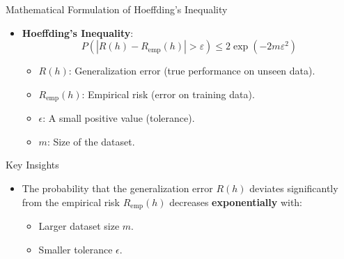 \documentclass[
  ignorenonframetext,
]{beamer}
\providecommand{\tightlist}{%
  \setlength{\itemsep}{0pt}\setlength{\parskip}{0pt}}\usepackage{longtable,booktabs,array}
\begin{document}
\begin{frame}{Mathematical Formulation of Hoeffding's Inequality}
\label{mathematical-formulation-of-hoeffdings-inequality}
\begin{itemize}
\tightlist
\item
  \textbf{Hoeffding's Inequality}: \[
  P(|R(h) - R_{\text{emp}}(h)| > \varepsilon) \leq 2 \exp(-2m\varepsilon^2)
  \]

  \begin{itemize}
  \tightlist
  \item
    \(R(h)\): Generalization error (true performance on unseen data).
  \item
    \(R_{\text{emp}}(h)\): Empirical risk (error on training data).
  \item
    \(\epsilon\): A small positive value (tolerance).
  \item
    \(m\): Size of the dataset.
  \end{itemize}
\end{itemize}
\end{frame}

\begin{frame}
\begin{block}{Key Insights}
\label{key-insights}
\begin{itemize}
\tightlist
\item
  The probability that the generalization error \(R(h)\) deviates
  significantly from the empirical risk \(R_{\text{emp}}(h)\) decreases
  \textbf{exponentially} with:

  \begin{itemize}
  \tightlist
  \item
    Larger dataset size \(m\).
  \item
    Smaller tolerance \(\epsilon\).
  \end{itemize}
\end{itemize}
\end{block}
\end{frame}
\end{document}
